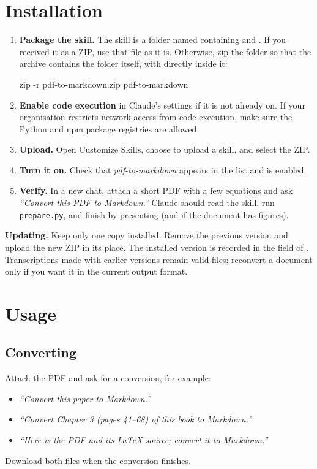 \documentclass[11pt,a4paper]{article}
\newcommand\step[1]{\textsf{\textbf{#1}}}
\begin{document}
\section{Installation}\label{sec:install}

\begin{enumerate}
\item \step{Package the skill.} The skill is a folder named  containing
   and . If you received it as a ZIP, use that file as it is.
  Otherwise, zip the folder so that the archive contains the folder itself, with
   directly inside it:
\begin{cmd}
zip -r pdf-to-markdown.zip pdf-to-markdown
\end{cmd}
\item \step{Enable code execution} in Claude's settings if it is not already on. If your
  organisation restricts network access from code execution, make sure the Python and npm
  package registries are allowed.
\item \step{Upload.} Open \textsf{Customize \textrightarrow{} Skills}, choose to upload a
  skill, and select the ZIP.
\item \step{Turn it on.} Check that \emph{pdf-to-markdown} appears in the list and is enabled.
\item \step{Verify.} In a new chat, attach a short PDF with a few equations and ask
  \emph{``Convert this PDF to Markdown.''} Claude should read the skill, run \texttt{prepare.py},
  and finish by presenting  (and  if the document has
  figures).
\end{enumerate}

\begin{note}
\textbf{Updating.} Keep only one copy installed. Remove the previous version and upload the
new ZIP in its place. The installed version is recorded in the  field
of . Transcriptions made with earlier versions remain valid files; reconvert a
document only if you want it in the current output format.
\end{note}

\section{Usage}

\subsection{Converting}
Attach the PDF and ask for a conversion, for example:
\begin{itemize}
\item \emph{``Convert this paper to Markdown.''}
\item \emph{``Convert Chapter 3 (pages 41--68) of this book to Markdown.''}
\item \emph{``Here is the PDF and its LaTeX source; convert it to Markdown.''}
\end{itemize}
Download both files when the conversion finishes.
\end{document}
